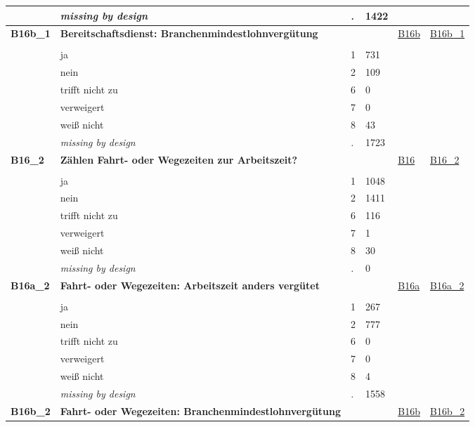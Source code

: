 \begin{longtable}{| L{2.45cm} | L{6cm} | C{1.5cm} | R{1cm} | C{2.25cm} | C{2.25cm} |}
   & \textit{missing by design} & \textit{.} & 1422 &  &  \\ 
   \midrule
\textbf{B16b\_1}\label{var:B16b:1} & \textbf{Bereitschaftsdienst: Branchenmindestlohnvergütung} &  &  & \hyperref[B16b]{B16b} & \hyperref[var:suf:B16b:1]{B16b\_1} \\ 
   &  &  &  &  &  \\ 
   & ja & 1 & 731 &  &  \\ 
   & nein & 2 & 109 &  &  \\ 
   & trifft nicht zu & 6 & 0 &  &  \\ 
   & verweigert & 7 & 0 &  &  \\ 
   & weiß nicht & 8 & 43 &  &  \\ 
   & \textit{missing by design} & \textit{.} & 1723 &  &  \\ 
   \midrule
\textbf{B16\_2}\label{var:B16:2} & \textbf{Zählen Fahrt- oder Wegezeiten zur Arbeitszeit?} &  &  & \hyperref[B16]{B16} & \hyperref[var:suf:B16:2]{B16\_2} \\ 
   &  &  &  &  &  \\ 
   & ja & 1 & 1048 &  &  \\ 
   & nein & 2 & 1411 &  &  \\ 
   & trifft nicht zu & 6 & 116 &  &  \\ 
   & verweigert & 7 & 1 &  &  \\ 
   & weiß nicht & 8 & 30 &  &  \\ 
   & \textit{missing by design} & \textit{.} & 0 &  &  \\ 
   \midrule
\textbf{B16a\_2}\label{var:B16a:2} & \textbf{Fahrt- oder Wegezeiten: Arbeitszeit anders vergütet} &  &  & \hyperref[B16a]{B16a} & \hyperref[var:suf:B16a:2]{B16a\_2} \\ 
   &  &  &  &  &  \\ 
   & ja & 1 & 267 &  &  \\ 
   & nein & 2 & 777 &  &  \\ 
   & trifft nicht zu & 6 & 0 &  &  \\ 
   & verweigert & 7 & 0 &  &  \\ 
   & weiß nicht & 8 & 4 &  &  \\ 
   & \textit{missing by design} & \textit{.} & 1558 &  &  \\ 
   \midrule
\textbf{B16b\_2}\label{var:B16b:2} & \textbf{Fahrt- oder Wegezeiten: Branchenmindestlohnvergütung} &  &  & \hyperref[B16b]{B16b} & \hyperref[var:suf:B16b:2]{B16b\_2} \\ 

\end{longtable}

